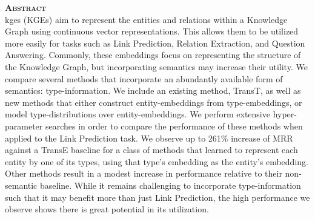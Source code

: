 \documentclass[nobib,a4paper,oneside,openany]{tufte-book}
\begin{document}
\newpage
\begin{fullwidth}
    \center
    \thispagestyle{empty}
    \begin{minipage}[h]{0.7\linewidth}
        \vspace{5cm}
        
        \center
        \textsc{\Large \textbf{Abstract}}\\[0.5em]
        
        \justify
        \glspl*{kge} (KGEs) aim to represent the entities and relations within a Knowledge Graph using continuous vector representations. This allows them to be utilized more easily for tasks such as Link Prediction, Relation Extraction, and Question Answering.
        Commonly, these embeddings focus on representing the structure of the Knowledge Graph, but incorporating semantics may increase their utility.
        We compare several methods that incorporate an abundantly available form of semantics: type-information.
        We include an existing method, TransT, as well as new methods that either construct entity-embeddings from type-embeddings, or model type-distributions over entity-embeddings.
        We perform extensive hyper-parameter searches in order to compare the performance of these methods when applied to the Link Prediction task.
        We observe up to 261\% increase of MRR against a TransE baseline for a class of methods that learned to represent each entity by one of its types, using that type's embedding as the entity's embedding. Other methods result in a modest increase in performance relative to their non-semantic baseline.
        While it remains challenging to incorporate type-information such that it may benefit more than just Link Prediction, the high performance we observe shows there is great potential in its utilization.
    \end{minipage}
\end{fullwidth}
\end{document}
